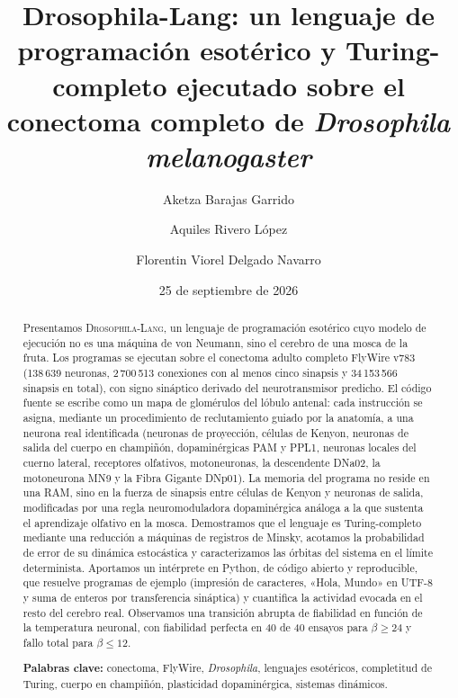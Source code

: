 \documentclass[11pt,a4paper]{article}
\title{\textbf{Drosophila-Lang}: un lenguaje de programación esotérico y
       Turing-completo ejecutado sobre el conectoma completo de
       \textit{Drosophila melanogaster}}
\author{
  Aketza Barajas Garrido \and Aquiles Rivero López \and Florentin Viorel Delgado Navarro
}
\date{25 de septiembre de 2026}
\theoremstyle{plain}
\theoremstyle{definition}
\theoremstyle{remark}
\newcommand{\dros}{\textup{\textsc{Drosophila-Lang}}}
\begin{document}
\maketitle

\begin{abstract}
Presentamos \dros{}, un lenguaje de programación esotérico cuyo modelo de
ejecución no es una máquina de von Neumann, sino el cerebro de una mosca de
la fruta. Los programas se ejecutan sobre el conectoma adulto completo FlyWire
v783 (138\,639 neuronas, 2\,700\,513 conexiones con al menos cinco sinapsis y
34\,153\,566 sinapsis en total), con signo sináptico derivado del
neurotransmisor predicho. El código fuente se escribe como un mapa de
glomérulos del lóbulo antenal: cada instrucción se asigna, mediante un
procedimiento de reclutamiento guiado por la anatomía, a una neurona real
identificada (neuronas de proyección, células de Kenyon, neuronas de salida
del cuerpo en champiñón, dopaminérgicas PAM y PPL1, neuronas locales del
cuerno lateral, receptores olfativos, motoneuronas, la descendente DNa02, la
motoneurona MN9 y la Fibra Gigante DNp01). La memoria del programa no reside
en una RAM, sino en la fuerza de sinapsis entre células de Kenyon y neuronas
de salida, modificadas por una regla neuromoduladora dopaminérgica análoga a
la que sustenta el aprendizaje olfativo en la mosca. Demostramos que el
lenguaje es Turing-completo mediante una reducción a máquinas de registros de
Minsky, acotamos la probabilidad de error de su dinámica estocástica y
caracterizamos las órbitas del sistema en el límite determinista. Aportamos
un intérprete en Python, de código abierto y reproducible, que resuelve
programas de ejemplo (impresión de caracteres, «Hola, Mundo» en UTF-8 y suma
de enteros por transferencia sináptica) y cuantifica la actividad evocada en
el resto del cerebro real. Observamos una transición abrupta de fiabilidad en
función de la temperatura neuronal, con fiabilidad perfecta en 40 de 40 ensayos
para $\beta\ge 24$ y fallo total para $\beta\le 12$.

\medskip
\noindent\textbf{Palabras clave:} conectoma, FlyWire, \textit{Drosophila},
lenguajes esotéricos, completitud de Turing, cuerpo en champiñón,
plasticidad dopaminérgica, sistemas dinámicos.
\end{abstract}
\end{document}
